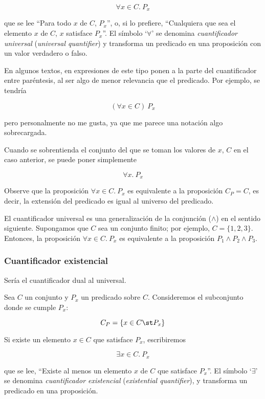 $$ \forall x \in C.\ P_x $$

\noindent que se lee ``Para todo $x$ de $C$, $P_x$'', o, si lo prefiere,
``Cualquiera que sea el elemento $x$ de $C$, $x$ satisface $P_x$''. El
símbolo `$\forall$' se denomina \emph{cuantificador universal}
(\emph{universal quantifier}) y transforma un predicado en una proposición
con un valor verdadero o falso.

En algunos textos, en expresiones de este tipo ponen a la parte del
cuantificador entre paréntesis, al ser algo de menor relevancia que el
predicado. Por ejemplo, se tendría

$$ (\forall x \in C) \ P_x $$

\noindent pero personalmente no me gusta, ya que me parece una notación algo
sobrecargada.

Cuando se sobrentienda el conjunto del que se toman los valores de $x$, $C$
en el caso anterior, se puede poner simplemente

$$ \forall x. \ P_x $$

Observe que la proposición $\forall x \in C.\ P_x$ es equivalente a la
proposición $C_P = C$, es decir, la extensión del predicado es igual al
universo del predicado.

El cuantificador universal es una generalización de la conjunción ($\land$)
en el sentido siguiente. Supongamos que $C$ sea un conjunto finito; por
ejemplo, $C = \{1, 2, 3\}$. Entonces, la proposición $\forall x \in C.\ P_x$
es equivalente a la proposición $P_1 \land P_2 \land P_3$.





\subsubsection{Cuantificador existencial}

Sería el cuantificador dual al universal.

Sea $C$ un conjunto y $P_x$ un predicado sobre $C$. Consideremos el
subconjunto donde se cumple $P_x$:

$$ C_P = \{x \in C \st P_x\} $$

\noindent Si existe un elemento $x \in C$ que satisface $P_x$, escribiremos

$$ \exists x \in C.\ P_x $$

\noindent que se lee, ``Existe al menos un elemento $x$ de $C$ que satisface
$P_x$''. El símbolo `$\exists$' se denomina \emph{cuantificador existencial}
(\emph{existential quantifier}), y transforma un predicado en una
proposición.

